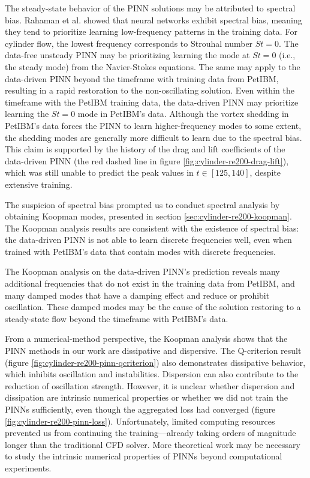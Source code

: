 The steady-state behavior of the PINN solutions may be attributed to spectral bias.
Rahaman et al. \cite{rahaman_spectral_2019} showed that neural networks exhibit spectral bias, meaning they tend to prioritize learning low-frequency patterns in the training data.
For cylinder flow, the lowest frequency corresponds to Strouhal number $St=0$.
The data-free unsteady PINN may be prioritizing learning the mode at $St=0$ (i.e., the steady mode) from the Navier-Stokes equations.
The same may apply to the data-driven PINN beyond the timeframe with training data from PetIBM, resulting in a rapid restoration to the non-oscillating solution.
Even within the timeframe with the PetIBM training data, the data-driven PINN may prioritize learning the $St=0$ mode in PetIBM's data.
Although the vortex shedding in PetIBM's data forces the PINN to learn higher-frequency modes to some extent, the shedding modes are generally more difficult to learn due to the spectral bias.
This claim is supported by the history of the drag and lift coefficients of the data-driven PINN (the red dashed line in figure \ref{fig:cylinder-re200-drag-lift}), which was still unable to predict the peak values in $t \in \left[125, 140\right]$, despite extensive training.

The suspicion of spectral bias prompted us to conduct spectral analysis by obtaining Koopman modes, presented in section \ref{sec:cylinder-re200-koopman}.
The Koopman analysis results are consistent with the existence of spectral bias: the data-driven PINN is not able to learn discrete frequencies well, even when trained with PetIBM's data that contain modes with discrete frequencies.

The Koopman analysis on the data-driven PINN's prediction reveals many additional frequencies that do not exist in the training data from PetIBM, and many damped modes that have a damping effect and reduce or prohibit oscillation.
These damped modes may be the cause of the solution restoring to a steady-state flow beyond the timeframe with PetIBM's data.

From a numerical-method perspective, the Koopman analysis shows that the PINN methods in our work are dissipative and dispersive.
The Q-criterion result (figure \ref{fig:cylinder-re200-pinn-qcriterion}) also demonstrates dissipative behavior, which inhibits oscillation and instabilities.
Dispersion can also contribute to the reduction of oscillation strength.
However, it is unclear whether dispersion and dissipation are intrinsic numerical properties or whether we did not train the PINNs sufficiently, even though the aggregated loss had converged (figure \ref{fig:cylinder-re200-pinn-loss}).
Unfortunately, limited computing resources prevented us from continuing the training---already taking orders of magnitude longer than the traditional CFD solver.
More theoretical work may be necessary to study the intrinsic numerical properties of PINNs beyond computational experiments.

